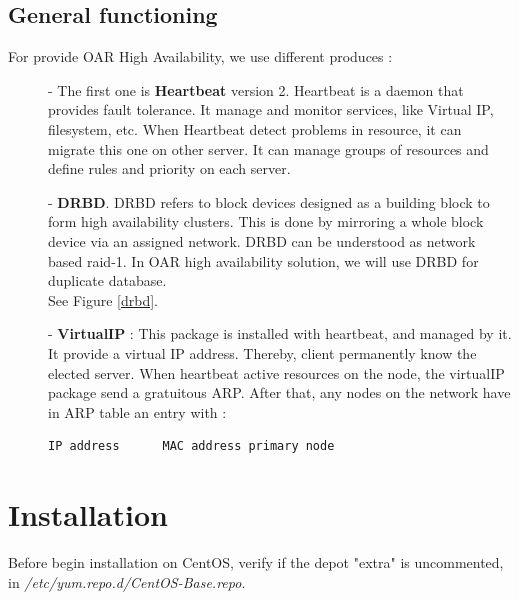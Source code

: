 \documentclass[a4paper,10pt]{report}
\begin{document}
\section{General functioning}
For provide OAR High Availability, we use different produces :
\begin{description}
\item[]- The first one is \textbf{Heartbeat} version 2. Heartbeat is a daemon that provides fault tolerance. It manage and monitor services, like Virtual IP, filesystem, etc. When Heartbeat detect problems in resource, it can migrate this one on other server. It can manage groups of resources and define rules and priority on each server.
\item[]- \textbf{DRBD}. DRBD refers to block devices designed as a building block to form high availability clusters. This is done by mirroring a whole block device via an assigned network. DRBD can be understood as network based raid-1. In OAR high availability solution, we will use DRBD for duplicate database.\\
See Figure \ref{drbd}.
\item[]- \textbf{VirtualIP} : This package is installed with heartbeat, and managed by it. It provide a virtual IP address. Thereby, client permanently know the elected server.
When heartbeat active resources on the node, the virtualIP package send a gratuitous ARP. After that, any nodes on the network have in ARP table an entry with :
\begin{lstlisting}
IP address		MAC address primary node
\end{lstlisting}

\end{description}













\chapter{Installation}

Before begin installation on CentOS, verify if the depot "extra" is uncommented, in \textit{/etc/yum.repo.d/CentOS-Base.repo}.
\end{document}
